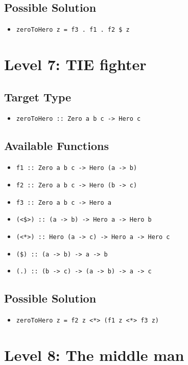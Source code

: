 \subsection*{Possible Solution} 
\begin{itemize}
    \item \texttt{zeroToHero z = f3 . f1 . f2 \$ z}
\end{itemize}

\section{Level 7: TIE fighter}
\subsection*{Target Type } 
\begin{itemize}
    \item \texttt{zeroToHero :: Zero a b c -> Hero c}
\end{itemize}

\subsection*{Available Functions} 
\begin{itemize}
    \item \texttt{f1 :: Zero a b c -> Hero (a -> b)}
    \item \texttt{f2 :: Zero a b c -> Hero (b -> c)}
    \item \texttt{f3 :: Zero a b c -> Hero a}
    \item \texttt{(<\$>) :: (a -> b) -> Hero a -> Hero b}
    \item \texttt{(<*>) :: Hero (a -> c) -> Hero a -> Hero c}
    \item \texttt{(\$) :: (a -> b) -> a -> b}
    \item \texttt{(.) :: (b -> c) -> (a -> b) -> a -> c}
\end{itemize}

\subsection*{Possible Solution} 
\begin{itemize}
    \item \texttt{zeroToHero z = f2 z <*> (f1 z <*> f3 z)}
\end{itemize}

\section{Level 8: The middle man}
